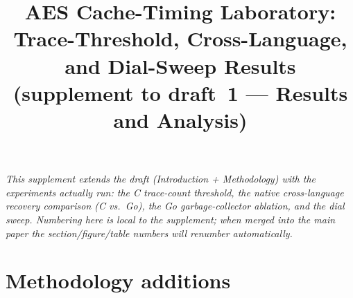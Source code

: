 \documentclass[11pt]{article}
\title{AES Cache-Timing Laboratory:\\
       Trace-Threshold, Cross-Language, and Dial-Sweep Results\\
       \large(supplement to draft~1 --- Results and Analysis)}
\author{}
\date{}
\begin{document}
\maketitle

\noindent\emph{This supplement extends the draft (Introduction + Methodology)
with the experiments actually run: the C trace-count threshold, the native
cross-language recovery comparison (C vs.\ Go), the Go garbage-collector
ablation, and the dial sweep. Numbering here is local to the supplement; when
merged into the main paper the section/figure/table numbers will renumber
automatically.}

\bigskip

\section{Methodology additions}





\end{document}
